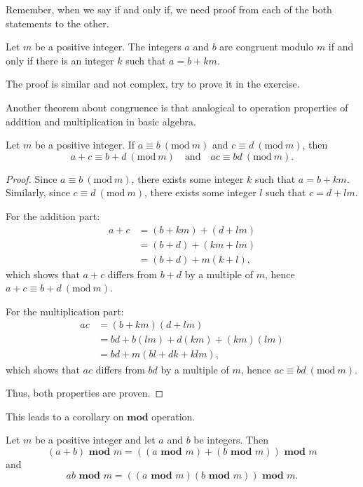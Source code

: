     \begin{remark}
        Remember, when we say if and only if, we need proof from each of the both statements to the other.
    \end{remark}
    \begin{theorem}\label{mod2}
        Let $m$ be a positive integer. The integers $a$ and $b$ are congruent modulo $m$ if and only if there is an integer $k$ such that $a = b + km$.
    \end{theorem}
    The proof is similar and not complex, try to prove it in the exercise.

    Another theorem about congruence is that analogical to operation properties of addition and multiplication in basic algebra.
    \begin{theorem}
        Let \( m \) be a positive integer. If \( a \equiv b \ (\text{mod}\ m) \) and \( c \equiv d \ (\text{mod}\ m) \), then
        \[ a + c \equiv b + d \ (\text{mod}\ m) \quad \text{and} \quad ac \equiv bd \ (\text{mod}\ m). \]
    \end{theorem}

    \begin{proof}
        Since \( a \equiv b \ (\text{mod}\ m) \), there exists some integer \( k \) such that \( a = b + km \). Similarly, since \( c \equiv d \ (\text{mod}\ m) \), there exists some integer \( l \) such that \( c = d + lm \).
        
        For the addition part:
        \begin{align*}
        a + c & = (b + km) + (d + lm) \\
        & = (b + d) + (km + lm) \\
        & = (b + d) + m(k + l),
        \end{align*}
        which shows that \( a + c \) differs from \( b + d \) by a multiple of \( m \), hence \( a + c \equiv b + d \ (\text{mod}\ m) \).
        
        For the multiplication part:
        \begin{align*}
        ac & = (b + km)(d + lm) \\
        & = bd + b(lm) + d(km) + (km)(lm) \\
        & = bd + m(bl + dk + klm),
        \end{align*}
        which shows that \( ac \) differs from \( bd \) by a multiple of \( m \), hence \( ac \equiv bd \ (\text{mod}\ m) \).
        
        Thus, both properties are proven.
    \end{proof}
    This leads to a corollary on $\textbf{mod}$ operation.
    \begin{corollary}
        Let \( m \) be a positive integer and let \( a \) and \( b \) be integers. Then
        \[(a + b) \textbf{ mod } m = ((a \textbf{ mod } m) + (b \textbf{ mod } m)) \textbf{ mod } m\]
        and
        \[ab \textbf{ mod } m = ((a \textbf{ mod } m)(b \textbf{ mod } m)) \textbf{ mod } m.\]
        \end{corollary}
        
